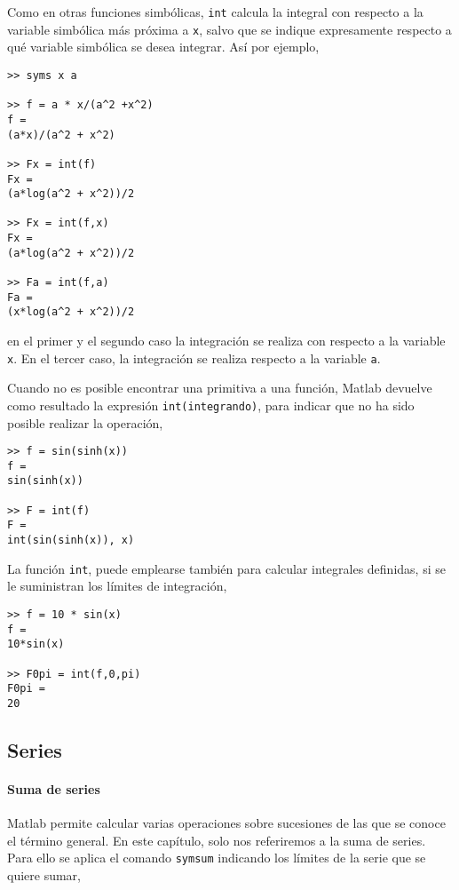 Como en otras funciones simbólicas, \texttt{int} calcula la integral con respecto a la variable simbólica más próxima a \texttt{x}, salvo que se indique expresamente respecto a qué variable simbólica se desea integrar. Así por ejemplo,
\begin{verbatim}
>> syms x a

>> f = a * x/(a^2 +x^2) 
f = 
(a*x)/(a^2 + x^2)

>> Fx = int(f) 
Fx =
(a*log(a^2 + x^2))/2 

>> Fx = int(f,x) 
Fx = 
(a*log(a^2 + x^2))/2
 
>> Fa = int(f,a) 
Fa = 
(x*log(a^2 + x^2))/2 
\end{verbatim}
en el primer y el segundo caso la integración se realiza con respecto a la variable \texttt{x}. En el tercer caso, la integración se realiza respecto a la variable \texttt{a}.

Cuando no es posible encontrar una primitiva a una función, Matlab devuelve como resultado la expresión \texttt{int(integrando)}, para indicar que no ha sido posible realizar la operación,
\begin{verbatim}
>> f = sin(sinh(x)) 
f = 
sin(sinh(x))
 
>> F = int(f) 
F = 
int(sin(sinh(x)), x)
\end{verbatim}

La función \texttt{int}, puede emplearse también para calcular integrales definidas, si se le suministran los límites de integración,

\begin{verbatim}
>> f = 10 * sin(x) 
f = 
10*sin(x)
 
>> F0pi = int(f,0,pi) 
F0pi = 
20
\end{verbatim}

\subsection{Series} 

\paragraph{Suma de series}Matlab permite calcular varias operaciones sobre sucesiones de las que se conoce el término general. En este capítulo, solo nos referiremos a la suma de series. 
Para ello se aplica el comando \texttt{symsum} indicando los límites de la serie que se quiere sumar,

